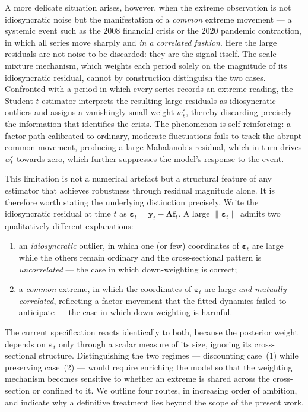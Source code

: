 \documentclass[11pt, a4paper, oneside]{article}
\newcommand{\mL}{\boldsymbol{\Lambda}}
\begin{document}
A more delicate situation arises, however, when the extreme
observation is not idiosyncratic noise but the manifestation of a
\emph{common} extreme movement --- a systemic event such as the
2008 financial crisis or the 2020 pandemic contraction, in which
all series move sharply and \emph{in a correlated fashion}. Here
the large residuals are not noise to be discarded: they are the
signal itself. The scale-mixture mechanism, which weights each
period solely on the magnitude of its idiosyncratic residual,
cannot by construction distinguish the two cases. Confronted with a
period in which every series records an extreme reading, the
Student-$t$ estimator interprets the resulting large residuals as
idiosyncratic outliers and assigns a vanishingly small weight
$w^\varepsilon_t$, thereby discarding precisely the information that
identifies the crisis. The phenomenon is self-reinforcing: a factor
path calibrated to ordinary, moderate fluctuations fails to track
the abrupt common movement, producing a large Mahalanobis residual,
which in turn drives $w^\varepsilon_t$ towards zero, which further
suppresses the model's response to the event.

This limitation is not a numerical artefact but a structural
feature of any estimator that achieves robustness through residual
magnitude alone. It is therefore worth stating the underlying
distinction precisely. Write the idiosyncratic residual at time $t$
as $\boldsymbol{\varepsilon}_t = \mathbf{y}_t -
\mL\mathbf{f}_t$. A large $\|\boldsymbol{\varepsilon}_t\|$
admits two qualitatively different explanations:
\begin{enumerate}
    \item an \emph{idiosyncratic} outlier, in which one (or few)
          coordinates of $\boldsymbol{\varepsilon}_t$ are large
          while the others remain ordinary and the cross-sectional
          pattern is \emph{uncorrelated} --- the case in which
          down-weighting is correct;
    \item a \emph{common} extreme, in which the coordinates of
          $\boldsymbol{\varepsilon}_t$ are large \emph{and mutually
          correlated}, reflecting a factor movement that the fitted
          dynamics failed to anticipate --- the case in which
          down-weighting is harmful.
\end{enumerate}
The current specification reacts identically to both, because the
posterior weight depends on $\boldsymbol{\varepsilon}_t$ only
through a scalar measure of its size, ignoring its cross-sectional
structure. Distinguishing the two regimes --- discounting case~(1)
while preserving case~(2) --- would require enriching the model so
that the weighting mechanism becomes sensitive to whether an
extreme is shared across the cross-section or confined to it. We
outline four routes, in increasing order of ambition, and indicate
why a definitive treatment lies beyond the scope of the present
work.
\end{document}
